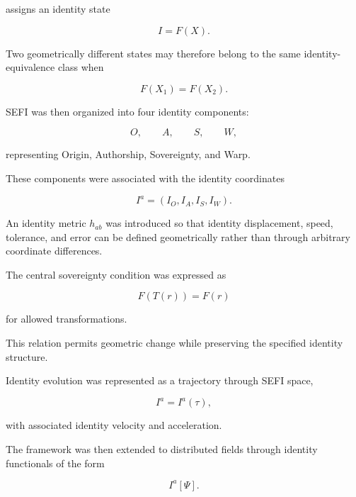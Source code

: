 \documentclass[12pt,oneside]{book}
\begin{document}
assigns an identity state

\begin{equation}
    I
    =
    F(X).
\end{equation}

Two geometrically different states may therefore belong to the
same identity-equivalence class when

\begin{equation}
    F(X_1)
    =
    F(X_2).
\end{equation}

SEFI was then organized into four identity components:

\begin{equation}
    O,
    \qquad
    A,
    \qquad
    S,
    \qquad
    W,
\end{equation}

representing Origin, Authorship, Sovereignty, and Warp.

These components were associated with the identity coordinates

\begin{equation}
    I^a
    =
    \left(
        I_O,
        I_A,
        I_S,
        I_W
    \right).
\end{equation}

An identity metric \(h_{ab}\) was introduced so that identity
displacement, speed, tolerance, and error can be defined
geometrically rather than through arbitrary coordinate
differences.

The central sovereignty condition was expressed as

\begin{equation}
    F(T(r))
    =
    F(r)
\end{equation}

for allowed transformations.

This relation permits geometric change while preserving the
specified identity structure.

Identity evolution was represented as a trajectory through SEFI
space,

\begin{equation}
    I^a
    =
    I^a(\tau),
\end{equation}

with associated identity velocity and acceleration.

The framework was then extended to distributed fields through
identity functionals of the form

\begin{equation}
    I^a[\Psi].
\end{equation}
\end{document}
